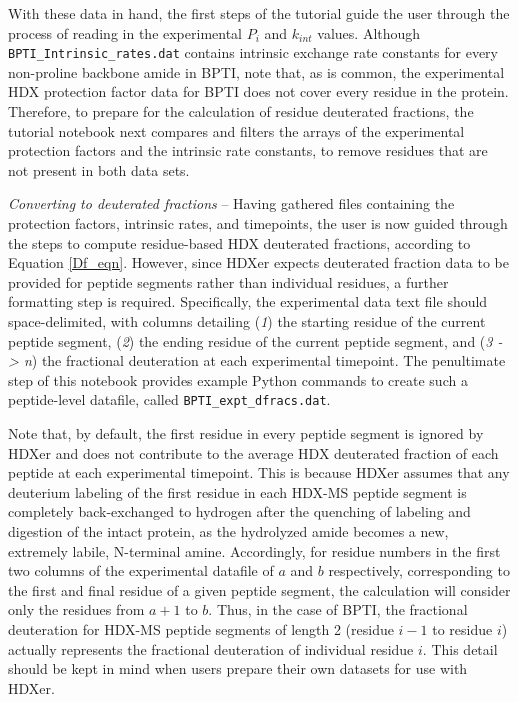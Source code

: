 \documentclass[9pt,tutorial]{livecoms}
\begin{document}
With these data in hand, the first steps of the tutorial guide the user through the process of reading in the experimental $P_i$ and $k_{int}$ values.
Although \texttt{BPTI\_Intrinsic\_rates.dat} contains intrinsic exchange rate constants for every non-proline backbone amide in BPTI, note that, as is common, the experimental HDX protection factor data for BPTI does not cover every residue in the protein. 
Therefore, to prepare for the calculation of residue deuterated fractions, the tutorial notebook next compares and filters the arrays of the experimental protection factors and the intrinsic rate constants, to remove residues that are not present in both data sets.

\noindent
\textit{Converting to deuterated fractions} -- Having gathered files containing the protection factors, intrinsic rates, and timepoints, the user is now guided through the steps to compute residue-based HDX deuterated fractions, according to Equation \ref{Df_eqn}.
However, since HDXer expects deuterated fraction data to be provided for peptide segments rather than individual residues, a further formatting step is required.
Specifically, the experimental data text file should space-delimited, with columns detailing (\textit{1}) the starting residue of the current peptide segment, (\textit{2}) the ending residue of the current peptide segment, and (\textit{3 -> n}) the fractional deuteration at each experimental timepoint.
The penultimate step of this notebook provides example Python commands to create such a peptide-level datafile, called \texttt{BPTI\_expt\_dfracs.dat}.

Note that, by default, the first residue in every peptide segment is ignored by HDXer and does not contribute to the average HDX deuterated fraction of each peptide at each experimental timepoint.
This is because HDXer assumes that any deuterium labeling of the first residue in each HDX-MS peptide segment is completely back-exchanged to hydrogen after the quenching of labeling and digestion of the intact protein, as the hydrolyzed amide becomes a new, extremely labile, N-terminal amine.
Accordingly, for residue numbers in the first two columns of the experimental datafile of $a$ and $b$ respectively, corresponding to the first and final residue of a given peptide segment, the calculation will consider only the residues from $a+1$ to $b$.
Thus, in the case of BPTI, the fractional deuteration for HDX-MS peptide segments of length 2 (residue $i-1$ to residue $i$) actually represents the fractional deuteration of individual residue $i$.
This detail should be kept in mind when users prepare their own datasets for use with HDXer.
\end{document}
